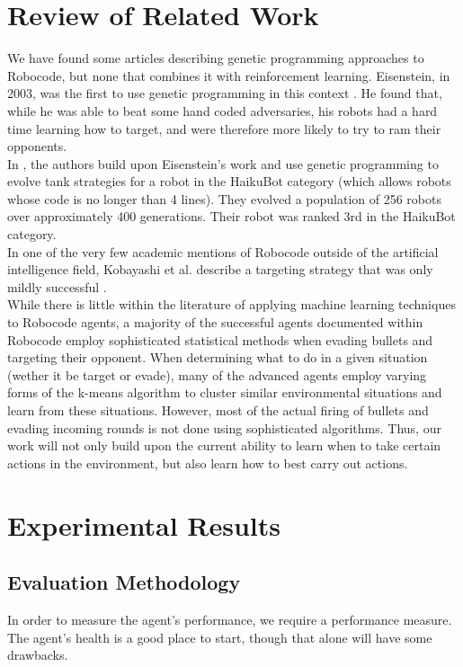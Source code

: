 \documentclass{article}
\theoremstyle{plain}
\theoremstyle{definition}
\theoremstyle{remark}
\begin{document}
\section{Review of Related Work}
We have found some articles describing genetic programming approaches to Robocode, but none that combines it with reinforcement learning. Eisenstein, in 2003, was the first to use genetic programming in this context \cite{gp2}. He found that, while he was able to beat some hand coded adversaries, his robots had a hard time learning how to target, and were therefore more likely to try to ram their opponents.\\

In \cite{gp1}, the authors build upon Eisenstein's work and use genetic programming to evolve tank strategies for a robot in the HaikuBot category (which allows robots whose code is no longer than 4 lines). They evolved a population of 256 robots over approximately 400 generations. Their robot was ranked 3rd in the HaikuBot category.\\

In one of the very few academic mentions of Robocode outside of the artificial intelligence field, Kobayashi et al. describe a targeting strategy that was only mildly successful \cite{strategies}. \\

While there is little within the literature of applying machine learning techniques to Robocode agents, a majority of the successful agents documented within Robocode employ sophisticated statistical methods when evading bullets and targeting their opponent. When determining what to do in a given situation (wether it be target or evade), many of the advanced agents employ varying forms of the k-means algorithm to cluster similar environmental situations and learn from these situations. However, most of the actual firing of bullets and evading incoming rounds is not done using sophisticated algorithms. Thus, our work will not only build upon the current ability to learn when to take certain actions in the environment, but also learn how to best carry out actions. 

\section{Experimental Results}

\subsection*{Evaluation Methodology}
In order to measure the agent's performance, we require a performance measure. The agent's health is a good place to start, though that alone will have some drawbacks.\\
\end{document}
